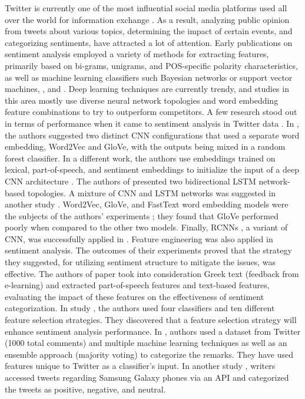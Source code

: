 Twitter is currently one of the most influential social media platforms used all over the world for information exchange \cite{zarrabeitia2023nuclear}. As a result, analyzing public opinion from tweets about various topics, determining the impact of certain events, and categorizing sentiments, have attracted a lot of attention. Early publications on sentiment analysis employed a variety of methods for extracting features, primarily based on bi-grams, unigrams, and POS-specific polarity characteristics, as well as machine learning classifiers such Bayesian networks or support vector machines, \cite{agarwal2011sentiment}, and \cite{kouloumpis2011twitter}. Deep learning techniques are currently trendy, and studies in this area mostly use diverse neural network topologies and word embedding feature combinations to try to outperform competitors. A few research stood out in terms of performance when it came to sentiment analysis in Twitter data \cite{qi2023sentiment}. In \cite{deriu2016swisscheese}, the authors suggested two distinct CNN configurations that used a separate word embedding, Word2Vec and GloVe, with the outputs being mixed in a random forest classifier. In a different work, the authors use embeddings trained on lexical, part-of-speech, and sentiment embeddings to initialize the input of a deep CNN architecture \cite{rouvier2016sensei}. The authors of \cite{baziotis2017datastories} presented two bidirectional LSTM network-based topologies. A mixture of CNN and LSTM networks was suggested in another study \cite{cliche2017bb_twtr}. Word2Vec, GloVe, and FastText word embedding models were the subjects of the authors' experiments \cite{bojanowski2017enriching}; they found that GloVe performed poorly when compared to the other two models. Finally, RCNNs \cite{lei2015semi}, a variant of CNN, was successfully applied in \cite{yin2017nnembs}. Feature engineering was also applied in sentiment analysis. The outcomes of their experiments proved that the strategy they suggested, for utilizing sentiment structure to mitigate the issues, was effective. The authors of paper \cite{spatiotis2017examining} took into consideration Greek text (feedback from e-learning) and extracted part-of-speech features and text-based features, evaluating the impact of these features on the effectiveness of sentiment categorization. In study \cite{prusa2015impact}, the authors used four classifiers and ten different feature selection strategies. They discovered that a feature selection strategy will enhance sentiment analysis performance. In \cite{ nazare2018sentiment}, authors used a dataset from Twitter (1000 total comments) and multiple machine learning techniques as well as an ensemble approach (majority voting) to categorize the remarks. They have used features unique to Twitter as a classifier's input. In another study \cite{das2014opinion}, writers accessed tweets regarding Samsung Galaxy phones via an API and categorized the tweets as positive, negative, and neutral.

